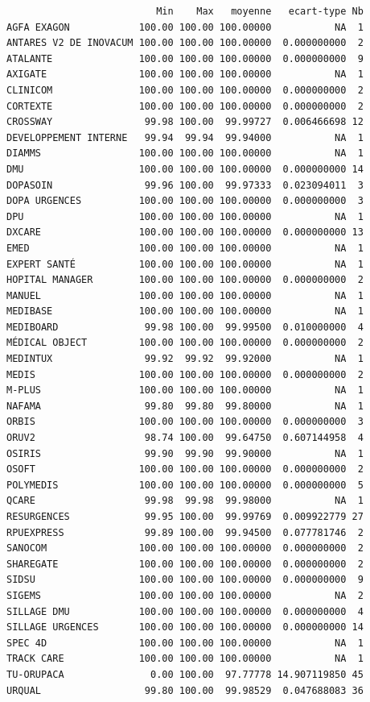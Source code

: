 \documentclass[]{article}
\begin{document}
\begin{verbatim}
                          Min    Max   moyenne   ecart-type Nb
AGFA EXAGON            100.00 100.00 100.00000           NA  1
ANTARES V2 DE INOVACUM 100.00 100.00 100.00000  0.000000000  2
ATALANTE               100.00 100.00 100.00000  0.000000000  9
AXIGATE                100.00 100.00 100.00000           NA  1
CLINICOM               100.00 100.00 100.00000  0.000000000  2
CORTEXTE               100.00 100.00 100.00000  0.000000000  2
CROSSWAY                99.98 100.00  99.99727  0.006466698 12
DEVELOPPEMENT INTERNE   99.94  99.94  99.94000           NA  1
DIAMMS                 100.00 100.00 100.00000           NA  1
DMU                    100.00 100.00 100.00000  0.000000000 14
DOPASOIN                99.96 100.00  99.97333  0.023094011  3
DOPA URGENCES          100.00 100.00 100.00000  0.000000000  3
DPU                    100.00 100.00 100.00000           NA  1
DXCARE                 100.00 100.00 100.00000  0.000000000 13
EMED                   100.00 100.00 100.00000           NA  1
EXPERT SANTÉ           100.00 100.00 100.00000           NA  1
HOPITAL MANAGER        100.00 100.00 100.00000  0.000000000  2
MANUEL                 100.00 100.00 100.00000           NA  1
MEDIBASE               100.00 100.00 100.00000           NA  1
MEDIBOARD               99.98 100.00  99.99500  0.010000000  4
MÉDICAL OBJECT         100.00 100.00 100.00000  0.000000000  2
MEDINTUX                99.92  99.92  99.92000           NA  1
MEDIS                  100.00 100.00 100.00000  0.000000000  2
M-PLUS                 100.00 100.00 100.00000           NA  1
NAFAMA                  99.80  99.80  99.80000           NA  1
ORBIS                  100.00 100.00 100.00000  0.000000000  3
ORUV2                   98.74 100.00  99.64750  0.607144958  4
OSIRIS                  99.90  99.90  99.90000           NA  1
OSOFT                  100.00 100.00 100.00000  0.000000000  2
POLYMEDIS              100.00 100.00 100.00000  0.000000000  5
QCARE                   99.98  99.98  99.98000           NA  1
RESURGENCES             99.95 100.00  99.99769  0.009922779 27
RPUEXPRESS              99.89 100.00  99.94500  0.077781746  2
SANOCOM                100.00 100.00 100.00000  0.000000000  2
SHAREGATE              100.00 100.00 100.00000  0.000000000  2
SIDSU                  100.00 100.00 100.00000  0.000000000  9
SIGEMS                 100.00 100.00 100.00000           NA  2
SILLAGE DMU            100.00 100.00 100.00000  0.000000000  4
SILLAGE URGENCES       100.00 100.00 100.00000  0.000000000 14
SPEC 4D                100.00 100.00 100.00000           NA  1
TRACK CARE             100.00 100.00 100.00000           NA  1
TU-ORUPACA               0.00 100.00  97.77778 14.907119850 45
URQUAL                  99.80 100.00  99.98529  0.047688083 36
\end{verbatim}
\end{document}
